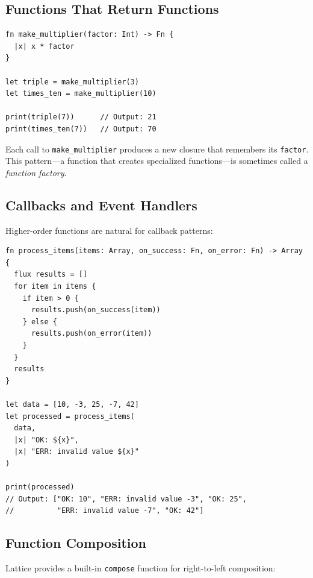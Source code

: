 \subsection{Functions That Return Functions}\label{sec:returning-functions}

\begin{lstlisting}[language=Lattice, caption={A function factory}]
fn make_multiplier(factor: Int) -> Fn {
  |x| x * factor
}

let triple = make_multiplier(3)
let times_ten = make_multiplier(10)

print(triple(7))      // Output: 21
print(times_ten(7))   // Output: 70
\end{lstlisting}

Each call to \lstinline|make_multiplier| produces a new closure that remembers its \lstinline|factor|. This pattern---a function that creates specialized functions---is sometimes called a \emph{function factory}.

\subsection{Callbacks and Event Handlers}\label{sec:callbacks}

Higher-order functions are natural for callback patterns:

\begin{lstlisting}[language=Lattice, caption={Processing with callbacks}]
fn process_items(items: Array, on_success: Fn, on_error: Fn) -> Array {
  flux results = []
  for item in items {
    if item > 0 {
      results.push(on_success(item))
    } else {
      results.push(on_error(item))
    }
  }
  results
}

let data = [10, -3, 25, -7, 42]
let processed = process_items(
  data,
  |x| "OK: ${x}",
  |x| "ERR: invalid value ${x}"
)

print(processed)
// Output: ["OK: 10", "ERR: invalid value -3", "OK: 25",
//          "ERR: invalid value -7", "OK: 42"]
\end{lstlisting}

\subsection{Function Composition}\label{sec:function-composition}

Lattice provides a built-in \lstinline|compose| function for right-to-left composition:

